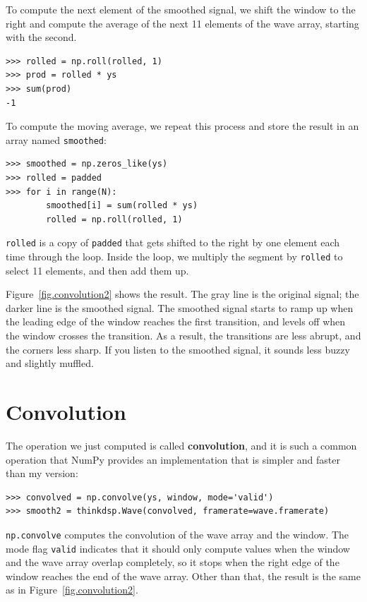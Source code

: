 \documentclass[12pt]{book}
\begin{document}
To compute the next element of the smoothed signal, we shift the
window to the right and compute the average of the next 11 elements of
the wave array, starting with the second.

\begin{verbatim}
>>> rolled = np.roll(rolled, 1)
>>> prod = rolled * ys
>>> sum(prod)
-1
\end{verbatim}

To compute the moving average, we repeat this process and store
the result in an array named {\tt smoothed}:

\begin{verbatim}
>>> smoothed = np.zeros_like(ys)
>>> rolled = padded
>>> for i in range(N):
        smoothed[i] = sum(rolled * ys)
        rolled = np.roll(rolled, 1)
\end{verbatim}

{\tt rolled} is a copy of {\tt padded} that gets shifted to
the right by one element each time through the loop.  Inside
the loop, we multiply the segment by {\tt rolled} to select
11 elements, and then add them up.

Figure~\ref{fig.convolution2} shows the result.  The gray line
is the original signal; the darker line is the smoothed signal.
The smoothed signal starts to ramp up when the leading edge of
the window reaches the first transition, and levels off when
the window crosses the transition.  As a result, the transitions
are less abrupt, and the corners less sharp.  If you listen
to the smoothed signal, it sounds less buzzy and slightly muffled.


\section{Convolution}
\label{convolution}

The operation we just computed is called {\bf convolution},
and it is such a common operation that NumPy provides an
implementation that is simpler and faster than my version:

\begin{verbatim}
>>> convolved = np.convolve(ys, window, mode='valid')
>>> smooth2 = thinkdsp.Wave(convolved, framerate=wave.framerate)
\end{verbatim}

{\tt np.convolve} computes the convolution of the wave
array and the window.  The mode flag {\tt valid} indicates
that it should only compute values when the window and the
wave array overlap completely, so it stops when the right
edge of the window reaches the end of the wave array.  Other
than that, the result is the same as in Figure~\ref{fig.convolution2}.
\end{document}
